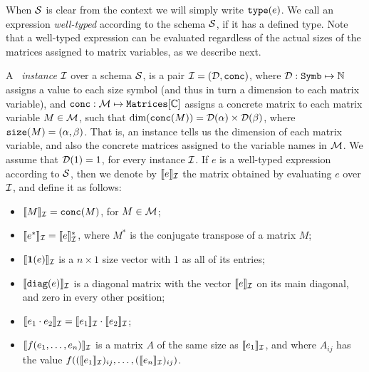 \medskip

When $\mathcal{S}$ is clear from the context we will simply write $\texttt{type}(e)$. We call an expression {\em well-typed} according to the schema $\mathcal{S}$, if it has a defined type. Note that a well-typed expression can be evaluated regardless of the actual sizes of the matrices assigned to matrix variables, as we describe next.

A \lang\ {\em instance} $\mathcal{I}$ over a schema $\mathcal{S}$, is a pair $\mathcal{I} = (\mathcal{D},\texttt{conc})$, where $\mathcal{D} : \texttt{Symb} \mapsto \mathbb{N}$ assigns a value to each size symbol (and thus in turn a dimension to each matrix variable), and $\texttt{conc} : \mathcal{M} \mapsto \texttt{Matrices}[\mathbb{C}]$ assigns a concrete matrix to each matrix variable $M\in \mathcal{M}$, such that $\dim(\texttt{conc}(M)) = \mathcal{D}(\alpha)\times \mathcal{D}(\beta)$, where $\texttt{size}(M) = (\alpha,\beta)$. That is, an instance tells us the dimension of each matrix variable, and also the concrete matrices assigned to the variable names in $\mathcal{M}$. We assume that $\mathcal{D}(1) = 1$, for every instance $\mathcal{I}$. If $e$ is a well-typed expression according to $\mathcal{S}$, then we denote by $\llbracket e \rrbracket_{\mathcal{I}}$ the matrix obtained by evaluating $e$ over $\mathcal{I}$, and define it as follows:
\begin{itemize}
\item $\llbracket M \rrbracket_{\mathcal{I}} = \texttt{conc}(M)$, for $M\in \mathcal{M}$;
\item $\llbracket e^* \rrbracket_{\mathcal{I}} = \llbracket e \rrbracket_{\mathcal{I}}^*$, where $M^*$ is the conjugate transpose of a matrix $M$;
\item $\llbracket \mathbf{1}(e) \rrbracket_{\mathcal{I}}$ is a $n\times 1$ size vector with 1 as all of its entries;
\item $\llbracket \texttt{diag}(e) \rrbracket_{\mathcal{I}}$ is a diagonal matrix with the vector $\llbracket e \rrbracket_{\mathcal{I}}$ on its main diagonal, and zero in every other position;
\item $\llbracket e_1\cdot e_2 \rrbracket_{\mathcal{I}} = \llbracket e_1 \rrbracket_{\mathcal{I}} \cdot \llbracket e_2 \rrbracket_{\mathcal{I}}$;
\item $\llbracket f(e_1,\ldots ,e_n) \rrbracket_{\mathcal{I}}$ is a matrix $A$ of the same size as $\llbracket e_1 \rrbracket_{\mathcal{I}}$, and where $A_{ij}$ has the value $f((\llbracket e_1 \rrbracket_{\mathcal{I}})_{ij},\ldots ,(\llbracket e_n \rrbracket_{\mathcal{I}})_{ij})$.
\end{itemize}